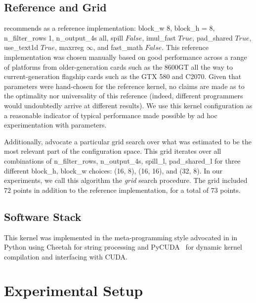 \documentclass{sig-alternate}
\begin{document}
\subsection{Reference and Grid}
\label{sec:refgrid}

\cite{pinto+cox:2011gcg} recommends as a reference implementation: block\_w 8, 
block\_h = 8, n\_filter\_rows 1, n\_output\_4s all, spill $False$, imul\_fast $True$,
pad\_shared $True$, 
use\_text1d $True$,
maxrreg $\infty$,
and fast\_math $False$.
This reference implementation was chosen manually based on good performance across a range of platforms from older-generation
cards such as the
8600GT all the way to
current-generation flagship cards such as the GTX 580 and C2070.
Given that parameters were hand-chosen for the reference kernel, no claims are
made as to the optimality nor universality of this reference (indeed, different
programmers would undoubtedly arrive at different results).  We use this
kernel configuration as a reasonable indicator of typical performance
made possible by ad hoc experimentation with parameters.

Additionally, \cite{pinto+cox:2011gcg} advocate a particular grid search over
what was estimated to be the most relevant part of the configuration space.
This grid iterates over all
combinations of n\_filter\_rows, n\_output\_4s, spill\_l, pad\_shared\_l for three different block\_h, block\_w choices: (16, 8), (16, 16), and (32, 8).
In our experiments, we call this algorithm the {\em grid} search procedure.
The grid included $72$ points in addition to the reference implementation, for a total of $73$ points.

\subsection{Software Stack}

This kernel was implemented in the meta-programming style advocated in
\citet{pinto+cox:2011gcg} in Python using Cheetah for string
processing and PyCUDA~\citep{klockner2011pycuda} for dynamic
kernel compilation and interfacing with CUDA.


\section{Experimental Setup}
\label{sec:exp}
\end{document}
